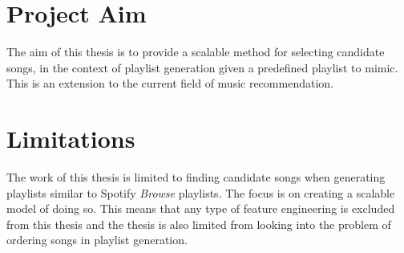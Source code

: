 \section{Project Aim}
The aim of this thesis is to provide a scalable method for selecting candidate songs, in the context of playlist generation given a predefined playlist to mimic. This is an extension to the current field of music recommendation.  

\section{Limitations}
The work of this thesis is limited to finding candidate songs when generating playlists similar to Spotify \textit{Browse} playlists. The focus is on creating a scalable model of doing so. This means that any type of feature engineering is excluded from this thesis and the thesis is also limited from looking into the problem of ordering songs in playlist generation. 
